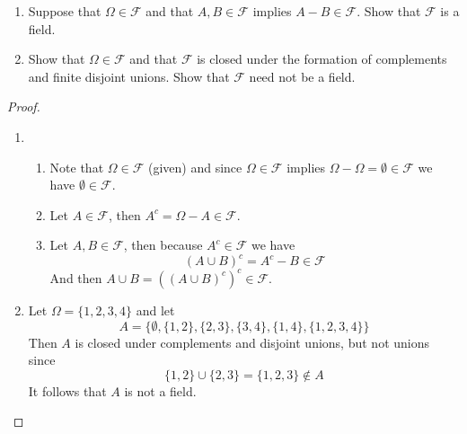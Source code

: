 \documentclass[11pt]{article}
\newcommand{\F}{\mathcal{F}}
\newcommand{\Om}{\Omega}
\newcommand{\es}{\emptyset}
\newcommand{\un}{\cup}
\newenvironment{exercise}[2][Exercise]{\begin{trivlist}
\item[\hskip \labelsep {\bfseries #1}\hskip \labelsep {\bfseries #2.}]}{\end{trivlist}}
\begin{document}
\begin{exercise}{2.3}
    \begin{enumerate}
        \item Suppose that $\Omega \in \F$ and that $A, B \in \F$ implies $A - B \in \F$. Show that $\F$ is a field.
        \item Show that $\Om \in \F$ and that $\F$ is closed under the formation of complements and finite disjoint unions. Show that $\F$ need not be a field.
    \end{enumerate}
\end{exercise}
\begin{proof}
    \begin{enumerate}
        \item \begin{enumerate}
            \item Note that $\Om \in \F$ (given) and since $\Om \in \F$ implies $\Om - \Om = \es \in \F$ we have $\es \in \F$.
            \item Let $A \in \F$, then $A^{c} = \Om - A \in \F$.
            \item Let $A, B \in \F$, then because $A^{c} \in \F$ we have
            \[ (A \un B)^{c} = A^{c} - B \in \F \]
            And then $A \un B = ((A \un B)^{c})^{c} \in \F$.
        \end{enumerate} 
        \item Let $\Om = \{ 1, 2, 3, 4 \}$ and let 
        \[ A = \{ \es, \{ 1, 2 \}, \{ 2, 3 \}, \{ 3, 4 \}, \{ 1, 4 \}, \{ 1, 2, 3, 4 \} \} \]
        Then $A$ is closed under complements and disjoint unions, but not unions since \[ \{ 1, 2 \} \un \{ 2, 3 \} = \{ 1, 2, 3 \} \notin A \]
        It follows that $A$ is not a field.
    \end{enumerate}
\end{proof}
\end{document}
